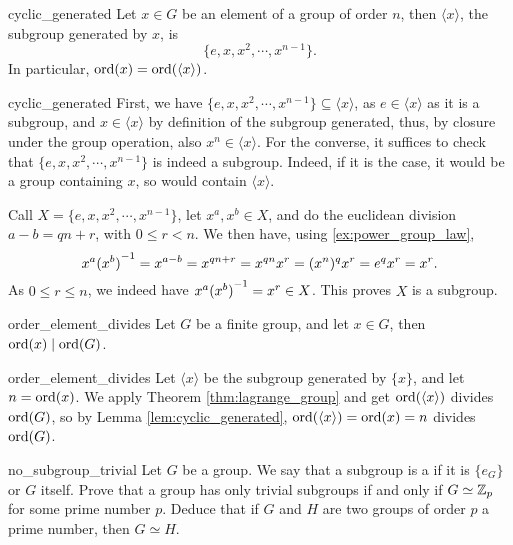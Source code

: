 \begin{clem}{}{cyclic_generated}
    Let \( x \in G \) be an element of a group of order \( n \), then \( \langle x \rangle \), the subgroup generated by \( x \), is 
    \begin{equation*}
        \{ e, x, x^2, \cdots, x^{n - 1} \}.
    \end{equation*}
    In particular, \( \operatorname{ord}(x) = \operatorname{ord}(\langle x \rangle) \).
\end{clem}
\begin{lemproof}{cyclic_generated}
    First, we have \( \{ e, x, x^2, \cdots, x^{n - 1} \} \subseteq \langle x \rangle \), as \( e \in \langle x \rangle \) as it is a subgroup, and \( x \in \langle x \rangle \) by definition of the subgroup generated, thus, by closure under the group operation, also \( x^n \in \langle x \rangle \). For the converse, it suffices to check that \( \{ e, x, x^2, \cdots, x^{n - 1} \} \) is indeed a subgroup. Indeed, if it is the case, it would be a group containing \( x \), so would contain \( \langle x \rangle \). 
    
    Call \( X = \{ e, x, x^2, \cdots, x^{n - 1} \} \), let \( x^a, x^b \in X \), and do the euclidean division \( a - b = qn + r \), with \( 0 \le r < n \). We then have, using \ref{ex:power_group_law},
    \begin{equation*}
        x^a {(x^b)}^{-1} = x^{a - b} = x^{qn + r} = x^{qn}x^r = (x^n)^qx^r = e^qx^r = x^r.
    \end{equation*}      
    As \( 0 \le r \le n \), we indeed have \( x^a {(x^b)}^{-1} = x^r \in X \). This proves \( X \) is a subgroup.
\end{lemproof}

\begin{ccor}{}{order_element_divides}
    Let \( G \) be a finite group, and let \( x \in G \), then \( \operatorname{ord}(x) \mid \operatorname{ord}(G) \).
\end{ccor}
\begin{corproof}{order_element_divides}
    Let \( \langle x \rangle \) be the subgroup generated by \( \{ x \} \), and let \( n = \operatorname{ord}(x) \). We apply Theorem \ref{thm:lagrange_group} and get \( \operatorname{ord}(\langle x \rangle) \) divides \( \operatorname{ord}(G) \), so by Lemma \ref{lem:cyclic_generated}, \( \operatorname{ord} (\langle x \rangle) = \operatorname{ord}(x) = n \) divides \( \operatorname{ord}(G) \).   
\end{corproof}

\begin{cex}{}{no_subgroup_trivial}
    Let \( G \) be a group. We say that a subgroup is a  if it is \( \{ e_G \} \) or \( G \) itself. Prove that a group has only trivial subgroups if and only if \( G \simeq \mathbb{Z}_p \) for some prime number \( p \). Deduce that if \( G \) and \( H \) are two groups of order \( p \) a prime number, then \( G \simeq H \). 
\end{cex}

